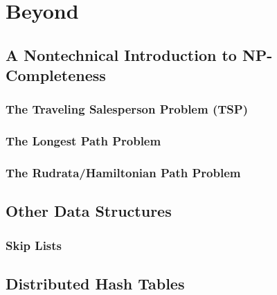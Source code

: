 \documentclass[10pt,a4paper]{book}
\begin{document}
\part{Beyond}

\chapter{A Nontechnical Introduction to NP-Completeness}

\section{The Traveling Salesperson Problem (TSP)}
\section{The Longest Path Problem}
\section{The Rudrata/Hamiltonian Path Problem}
\chapter{Other Data Structures}


\section{Skip Lists}


\chapter{Distributed Hash Tables}
\end{document}
